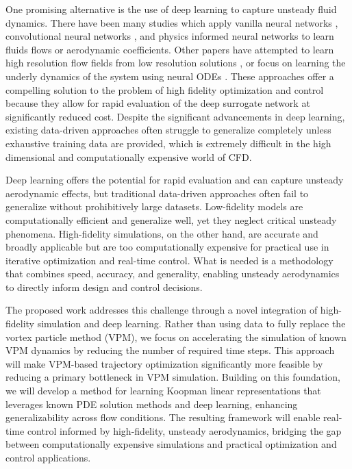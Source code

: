 \documentclass[12pt, letterpaper]{article}
\begin{document}
One promising alternative is the use of deep learning to capture unsteady fluid dynamics.  There have been many studies which apply vanilla neural networks \cite{collotta2014arealtime, sabater2021fast}, convolutional neural networks \cite{abucide2021adata, hwang2025aerodynamic}, and physics informed neural networks \cite{raissi2019physics, lin2025aphysics} to learn fluids flows or aerodynamic coefficients.  Other papers have attempted to learn high resolution flow fields from low resolution solutions \cite{sharma2025accelerating, gao2021super}, or focus on learning the underly dynamics of the system using neural ODEs \cite{jarry2025neuralodeapproachaircraft, ma2024development}.  These approaches offer a compelling solution to the problem of high fidelity optimization and control because they allow for rapid evaluation of the deep surrogate network at significantly reduced cost.  Despite the significant advancements in deep learning, existing data-driven approaches often struggle to generalize completely unless exhaustive training data are provided, which is extremely difficult in the high dimensional and computationally expensive world of CFD. 

Deep learning offers the potential for rapid evaluation and can capture unsteady aerodynamic effects, but traditional data-driven approaches often fail to generalize without prohibitively large datasets. Low-fidelity models are computationally efficient and generalize well, yet they neglect critical unsteady phenomena. High-fidelity simulations, on the other hand, are accurate and broadly applicable but are too computationally expensive for practical use in iterative optimization and real-time control. What is needed is a methodology that combines speed, accuracy, and generality, enabling unsteady aerodynamics to directly inform design and control decisions.

The proposed work addresses this challenge through a novel integration of high-fidelity simulation and deep learning. Rather than using data to fully replace the vortex particle method (VPM), we focus on accelerating the simulation of known VPM dynamics by reducing the number of required time steps. This approach will make VPM-based trajectory optimization significantly more feasible by reducing a primary bottleneck in VPM simulation. Building on this foundation, we will develop a method for learning Koopman linear representations that leverages known PDE solution methods and deep learning, enhancing generalizability across flow conditions. The resulting framework will enable real-time control informed by high-fidelity, unsteady aerodynamics, bridging the gap between computationally expensive simulations and practical optimization and control applications.
\end{document}
